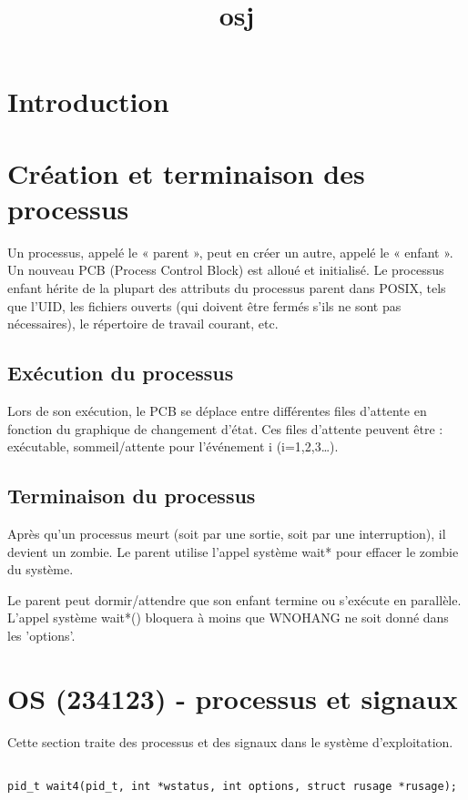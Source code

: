 \documentclass[12pt]{report}
\title{osj}
\author{}
\begin{document}
\maketitle
\tableofcontents
\newpage

\section{Introduction}
\section{Création et terminaison des processus}

Un processus, appelé le « parent », peut en créer un autre, appelé le « enfant ». Un nouveau PCB (Process Control Block) est alloué et initialisé. Le processus enfant hérite de la plupart des attributs du processus parent dans POSIX, tels que l'UID, les fichiers ouverts (qui doivent être fermés s'ils ne sont pas nécessaires), le répertoire de travail courant, etc.

\subsection{Exécution du processus}

Lors de son exécution, le PCB se déplace entre différentes files d'attente en fonction du graphique de changement d'état. Ces files d'attente peuvent être : exécutable, sommeil/attente pour l'événement i (i=1,2,3…).

\subsection{Terminaison du processus}

Après qu'un processus meurt (soit par une sortie, soit par une interruption), il devient un zombie. Le parent utilise l'appel système wait* pour effacer le zombie du système.

Le parent peut dormir/attendre que son enfant termine ou s'exécute en parallèle. L'appel système wait*() bloquera à moins que WNOHANG ne soit donné dans les 'options'.

\section{OS (234123) - processus et signaux}

Cette section traite des processus et des signaux dans le système d'exploitation.
\begin{lstlisting}

pid_t wait4(pid_t, int *wstatus, int options, struct rusage *rusage);

\end{lstlisting}
\end{document}
